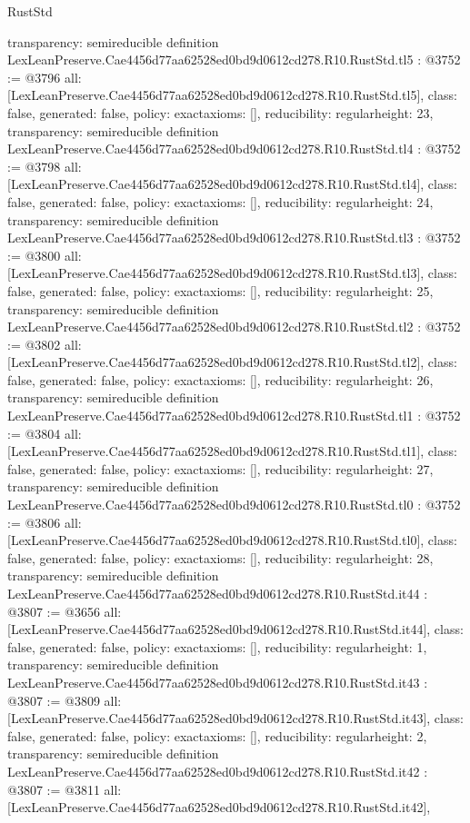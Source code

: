 \begin{lexlean}{RustStd}
\begin{coremodule}
{  transparency: semireducible
}
definition LexLeanPreserve.Cae4456d77aa62528ed0bd9d0612cd278.R10.RustStd.tl5 : @3752 := @3796 {
  all: [LexLeanPreserve.Cae4456d77aa62528ed0bd9d0612cd278.R10.RustStd.tl5],
  class: false,
  generated: false,
  policy: exact{axioms: []},
  reducibility: regular{height: 23},
  transparency: semireducible
}
definition LexLeanPreserve.Cae4456d77aa62528ed0bd9d0612cd278.R10.RustStd.tl4 : @3752 := @3798 {
  all: [LexLeanPreserve.Cae4456d77aa62528ed0bd9d0612cd278.R10.RustStd.tl4],
  class: false,
  generated: false,
  policy: exact{axioms: []},
  reducibility: regular{height: 24},
  transparency: semireducible
}
definition LexLeanPreserve.Cae4456d77aa62528ed0bd9d0612cd278.R10.RustStd.tl3 : @3752 := @3800 {
  all: [LexLeanPreserve.Cae4456d77aa62528ed0bd9d0612cd278.R10.RustStd.tl3],
  class: false,
  generated: false,
  policy: exact{axioms: []},
  reducibility: regular{height: 25},
  transparency: semireducible
}
definition LexLeanPreserve.Cae4456d77aa62528ed0bd9d0612cd278.R10.RustStd.tl2 : @3752 := @3802 {
  all: [LexLeanPreserve.Cae4456d77aa62528ed0bd9d0612cd278.R10.RustStd.tl2],
  class: false,
  generated: false,
  policy: exact{axioms: []},
  reducibility: regular{height: 26},
  transparency: semireducible
}
definition LexLeanPreserve.Cae4456d77aa62528ed0bd9d0612cd278.R10.RustStd.tl1 : @3752 := @3804 {
  all: [LexLeanPreserve.Cae4456d77aa62528ed0bd9d0612cd278.R10.RustStd.tl1],
  class: false,
  generated: false,
  policy: exact{axioms: []},
  reducibility: regular{height: 27},
  transparency: semireducible
}
definition LexLeanPreserve.Cae4456d77aa62528ed0bd9d0612cd278.R10.RustStd.tl0 : @3752 := @3806 {
  all: [LexLeanPreserve.Cae4456d77aa62528ed0bd9d0612cd278.R10.RustStd.tl0],
  class: false,
  generated: false,
  policy: exact{axioms: []},
  reducibility: regular{height: 28},
  transparency: semireducible
}
definition LexLeanPreserve.Cae4456d77aa62528ed0bd9d0612cd278.R10.RustStd.it44 : @3807 := @3656 {
  all: [LexLeanPreserve.Cae4456d77aa62528ed0bd9d0612cd278.R10.RustStd.it44],
  class: false,
  generated: false,
  policy: exact{axioms: []},
  reducibility: regular{height: 1},
  transparency: semireducible
}
definition LexLeanPreserve.Cae4456d77aa62528ed0bd9d0612cd278.R10.RustStd.it43 : @3807 := @3809 {
  all: [LexLeanPreserve.Cae4456d77aa62528ed0bd9d0612cd278.R10.RustStd.it43],
  class: false,
  generated: false,
  policy: exact{axioms: []},
  reducibility: regular{height: 2},
  transparency: semireducible
}
definition LexLeanPreserve.Cae4456d77aa62528ed0bd9d0612cd278.R10.RustStd.it42 : @3807 := @3811 {
  all: [LexLeanPreserve.Cae4456d77aa62528ed0bd9d0612cd278.R10.RustStd.it42],
}
\end{coremodule}
\end{lexlean}
